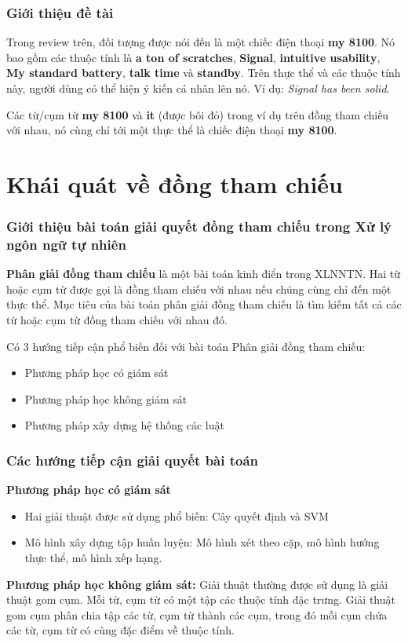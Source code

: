 \documentclass{beamer}
\begin{document}
\begin{frame}
\frametitle{Giới thiệu đề tài}
\begin{block}{}
Trong review trên, đối tượng được nói đến là một chiếc điện thoại \textbf{my 8100}. Nó bao gồm các thuộc tính là \textbf{a ton of scratches}, \textbf{Signal}, \textbf{intuitive usability}, \textbf{My standard battery}, \textbf{talk time} và \textbf{standby}. Trên thực thể và các thuộc tính này, người dùng có thể hiện ý kiến cá nhân lên nó. Ví dụ: \textit{Signal has been solid}. 
\end{block}
\begin{block}{}
Các từ/cụm từ \textbf{my 8100} và \textbf{it} (được bôi đỏ) trong ví dụ trên đồng tham chiếu với nhau, nó cùng chỉ tới một thực thể là chiếc điện thoại \textbf{my 8100}.
\end{block}
\end{frame}

\section{Khái quát về đồng tham chiếu}
\begin{frame}
\frametitle{Giới thiệu bài toán giải quyết đồng tham chiếu trong Xử lý ngôn ngữ tự nhiên}
\begin{block}{}
\textbf{Phân giải đồng tham chiếu} là một bài toán kinh điển trong XLNNTN. Hai từ hoặc cụm từ được gọi là đồng tham chiếu với nhau nếu chúng cùng chỉ đến một thực thể.
Mục tiêu của bài toán phân giải đồng tham chiếu là tìm kiếm tất cả các từ hoặc cụm từ đồng tham chiếu với nhau đó.
\end{block}
\begin{block}{}
Có 3 hướng tiếp cận phổ biến đối với bài toán Phân giải đồng tham chiếu:
\begin{itemize}
\item Phương pháp học có giám sát
\item Phương pháp học không giám sát
\item Phương pháp xây dựng hệ thống các luật
\end{itemize}
\end{block}
\end{frame}
\begin{frame}
\frametitle{Các hướng tiếp cận giải quyết bài toán}
\begin{block}{}
\textbf{Phương pháp học có giám sát}
\begin{itemize}
\item Hai giải thuật được sử dụng phổ biến: Cây quyết định và SVM
\item Mô hình xây dựng tập huấn luyện: Mô hình xét theo cặp, mô hình hướng thực thể, mô hình xếp hạng.
\end{itemize}
\end{block}
\begin{block}{}
\textbf{Phương pháp học không giám sát:} Giải thuật thường được sử dụng là giải thuật gom cụm.
Mỗi từ, cụm từ có một tập các thuộc tính đặc trưng. Giải thuật gom cụm phân chia tập các từ, cụm từ thành các cụm, trong đó mỗi cụm chứa các từ, cụm từ có cùng đặc điểm về thuộc tính.
\end{block}
\end{frame}
\end{document}
